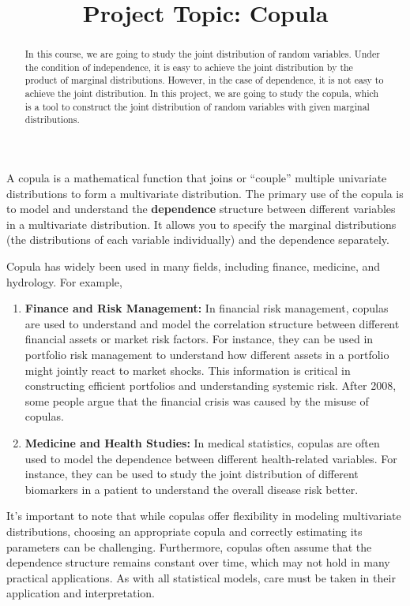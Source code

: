 \documentclass{article}
\title{Project Topic: Copula}
\author{}
\date{}
\theoremstyle{definition}
\theoremstyle{remark}
\begin{document}
\maketitle
\begin{abstract}
    In this course, we are going to study the joint distribution of random variables. Under the condition of independence, it is easy to achieve the joint distribution by the product of marginal distributions. However, in the case of dependence, it is not easy to achieve the joint distribution. In this project, we are going to study the copula, which is a tool to construct the joint distribution of random variables with given marginal distributions.
\end{abstract}

A copula is a mathematical function that joins or ``couple'' multiple univariate distributions to form a multivariate distribution. The primary use of the copula is to model and understand the \textbf{dependence} structure between different variables in a multivariate distribution. It allows you to specify the marginal distributions (the distributions of each variable individually) and the dependence separately.

Copula has widely been used in many fields, including finance, medicine, and hydrology. For example,

\begin{enumerate}
    \item \textbf{Finance and Risk Management:} In financial risk management, copulas are used to understand and model the correlation structure between different financial assets or market risk factors. For instance, they can be used in portfolio risk management to understand how different assets in a portfolio might jointly react to market shocks. This information is critical in constructing efficient portfolios and understanding systemic risk. After 2008, some people argue that the financial crisis was caused by the misuse of copulas.
    \item \textbf{Medicine and Health Studies:} In medical statistics, copulas are often used to model the dependence between different health-related variables. For instance, they can be used to study the joint distribution of different biomarkers in a patient to understand the overall disease risk better.
\end{enumerate}

It's important to note that while copulas offer flexibility in modeling multivariate distributions, choosing an appropriate copula and correctly estimating its parameters can be challenging. Furthermore, copulas often assume that the dependence structure remains constant over time, which may not hold in many practical applications. As with all statistical models, care must be taken in their application and interpretation.
\end{document}
